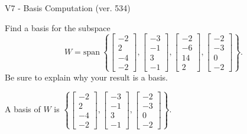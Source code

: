 \begin{exercise}
  \begin{exerciseTitle}V7 - Basis Computation (ver. 534)\end{exerciseTitle}
  \begin{exerciseStatement}
    Find a basis for the subspace 
\[W=\mathrm{span}\ \left\{\left[\begin{array}{r}
-2 \\
2 \\
-4 \\
-2
\end{array}\right] , \left[\begin{array}{r}
-3 \\
-1 \\
3 \\
-1
\end{array}\right] , \left[\begin{array}{r}
-2 \\
-6 \\
14 \\
2
\end{array}\right] , \left[\begin{array}{r}
-2 \\
-3 \\
0 \\
-2
\end{array}\right]\right\}.\]
 Be sure to explain why your result is a basis.


  \end{exerciseStatement}
  \begin{exerciseAnswer}
   A basis of \(W\) is  \(\left\{\left[\begin{array}{r}
-2 \\
2 \\
-4 \\
-2
\end{array}\right] , \left[\begin{array}{r}
-3 \\
-1 \\
3 \\
-1
\end{array}\right] , \left[\begin{array}{r}
-2 \\
-3 \\
0 \\
-2
\end{array}\right]\right\}\).
  


  \end{exerciseAnswer}
\end{exercise}